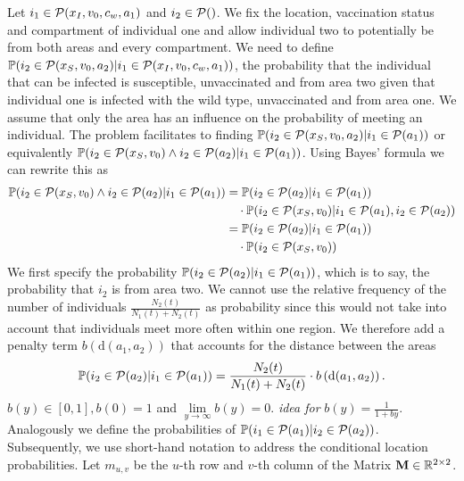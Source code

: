 Let $i_1 \in \mathcal{P}(x_I, v_0, c_w, a_1)$ and $i_2 \in \mathcal{P}()$.  We fix the location, vaccination status and compartment of individual one and allow individual two to potentially be from both areas and every compartment. We need to define $\mathbb{P}(i_2 \in \mathcal{P}(x_S, v_0 ,a_2)|i_1 \in \mathcal{P}(x_I, v_0,c_w, a_1))$, the probability that the individual that can be infected is susceptible, unvaccinated and from area two given that individual one is infected with the wild type, unvaccinated and from area one. We assume that only the area has an influence on the probability of meeting an individual. The problem facilitates to finding $\mathbb{P}(i_2 \in \mathcal{P}(x_S, v_0 ,a_2)|i_1 \in \mathcal{P}(a_1))$ or equivalently $\mathbb{P}(i_2 \in \mathcal{P}(x_S, v_0) \wedge i_2 \in \mathcal{P}(a_2) | i_1 \in \mathcal{P}(a_1))$. Using Bayes' formula we can rewrite this as
\begin{align*}
\mathbb{P}(i_2 \in \mathcal{P}(x_S, v_0) \wedge i_2 \in \mathcal{P}(a_2) | i_1 \in \mathcal{P}(a_1)) &= \mathbb{P}(i_2 \in \mathcal{P}(a_2) | i_1 \in \mathcal{P}(a_1) )  \notag \\
& \quad \cdot \mathbb{P}(i_2 \in \mathcal{P}(x_S, v_0) | i_1 \in \mathcal{P}(a_1), i_2 \in \mathcal{P}(a_2) ) \notag \\
&= \mathbb{P}(i_2 \in \mathcal{P}(a_2) | i_1 \in \mathcal{P}(a_1) )  \notag \\
& \quad \cdot \mathbb{P}(i_2 \in \mathcal{P}(x_S, v_0))
\end{align*} 
We first specify the probability $\mathbb{P}(i_2 \in \mathcal{P}(a_2) | i_1 \in \mathcal{P}(a_1) )$, which is to say, the probability that $i_2$ is from area two. We cannot use the relative frequency of the number of individuals $\frac{N_{2}(t)}{N_1(t) + N_2(t)}$ as probability since this would not take into account that individuals meet more often within one region. We therefore add a penalty term $b\left(\text{d}(a_1, a_2) \right)$ that accounts for the distance between the areas
\begin{align*}
\mathbb{P}(i_2 \in \mathcal{P}(a_2) | i_1 \in \mathcal{P}(a_1) ) = \frac{N_{2}(t)}{N_1(t) + N_2(t)} \cdot b\left(\text{d}(a_1, a_2) \right).
\end{align*}
$b(y) \in [0,1], b\left(0\right) = 1$ and $\lim\limits_{y \to \infty} b\left(y\right) = 0$. \textit{idea for} $b(y)= \frac{1}{1 + b y}$. Analogously we define the probabilities of $\mathbb{P}(i_1 \in \mathcal{P}(a_1) | i_2 \in \mathcal{P}(a_2) )$. Subsequently, we use short-hand notation to address the conditional location probabilities. Let $m_{u,v}$ be the $u$-th row and $v$-th column of the Matrix $\mathbf{M} \in \mathbb{R}^{2 \times 2}$.

